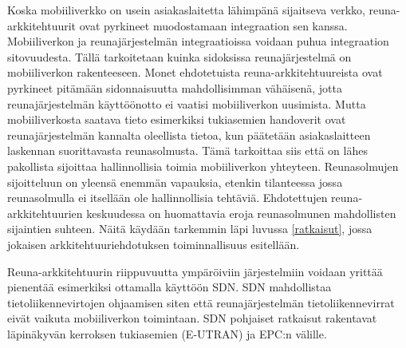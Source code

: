 Koska mobiiliverkko on usein asiakaslaitetta lähimpänä sijaitseva verkko, reuna-arkkitehtuurit ovat pyrkineet muodostamaan integraation sen kanssa.
Mobiiliverkon ja reunajärjestelmän integraatioissa voidaan puhua integraation sitovuudesta. 
Tällä tarkoitetaan kuinka sidoksissa reunajärjestelmä on mobiiliverkon rakenteeseen.
Monet ehdotetuista reuna-arkkitehtuureista ovat pyrkineet pitämään sidonnaisuutta mahdollisimman vähäisenä, jotta reunajärjestelmän käyttöönotto ei vaatisi mobiiliverkon uusimista.
Mutta mobiiliverkosta saatava tieto esimerkiksi tukiasemien handoverit ovat reunajärjestelmän kannalta oleellista tietoa, kun päätetään asiakaslaitteen laskennan suorittavasta reunasolmusta.
Tämä tarkoittaa siis että on lähes pakollista sijoittaa hallinnollisia toimia mobiiliverkon yhteyteen.
Reunasolmujen sijoitteluun on yleensä enemmän vapauksia, etenkin tilanteessa jossa reunasolmulla ei itsellään ole hallinnollisia tehtäviä.
Ehdotettujen reuna-arkkitehtuurien keskuudessa on huomattavia eroja reunasolmunen mahdollisten sijaintien suhteen. Näitä käydään tarkemmin läpi luvussa \ref{ratkaisut}, jossa jokaisen arkkitehtuuriehdotuksen toiminnallisuus esitellään. 

Reuna-arkkitehtuurin riippuvuutta ympäröiviin järjestelmiin voidaan yrittää pienentää esimerkiksi ottamalla käyttöön SDN. SDN mahdollistaa tietoliikennevirtojen ohjaamisen siten että reunajärjestelmän tietoliikennevirrat eivät vaikuta mobiiliverkon toimintaan. SDN pohjaiset ratkaisut rakentavat läpinäkyvän kerroksen tukiasemien (E-UTRAN) ja EPC:n välille.

















